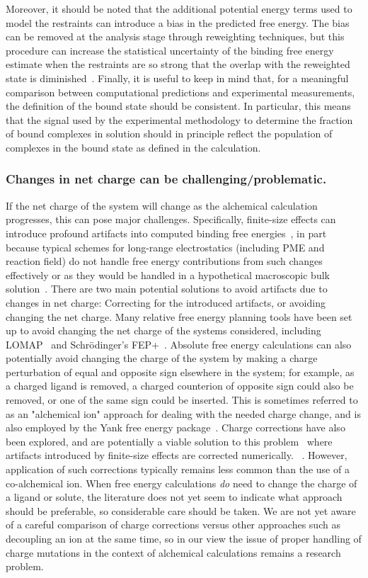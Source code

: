 \documentclass[9pt,bestpractices]{livecoms}
\begin{document}
Moreover, it should be noted that the additional potential energy terms used to model the restraints can introduce a bias in the predicted free energy.
The bias can be removed at the analysis stage through reweighting techniques, but this procedure can increase the statistical uncertainty of the binding free energy estimate when the restraints are so strong that the overlap with the reweighted state is diminished~\cite{}.
%
Finally, it is useful to keep in mind that, for a meaningful comparison between computational predictions and experimental measurements, the definition of the bound state should be consistent.
In particular, this means that the signal used by the experimental methodology to determine the fraction of bound complexes in solution should in principle reflect the population of complexes in the bound state as defined in the calculation.
%
\subsubsection{Changes in net charge can be challenging/problematic.}
If the net charge of the system will change as the alchemical calculation progresses, this can pose major challenges.
Specifically, finite-size effects can introduce profound artifacts into computed binding free energies~\cite{}, in part because typical schemes for long-range electrostatics (including PME and reaction field) do not handle free energy contributions from such changes effectively or as they would be handled in a hypothetical macroscopic bulk solution~\cite{}.
%
There are two main potential solutions to avoid artifacts due to changes in net charge: Correcting for the introduced artifacts, or avoiding changing the net charge.
%
Many relative free energy planning tools have been set up to avoid changing the net charge of the systems considered, including LOMAP~\cite{liu2013lead} and Schr\"{o}dinger's FEP+~\cite{wang2015accurate}. Absolute free energy calculations can also potentially avoid changing the charge of the system by making a charge perturbation of equal and opposite sign elsewhere in the system; for example, as a charged ligand is removed, a charged counterion of opposite sign could also be removed, or one of the same sign could be inserted. This is sometimes referred to as an "alchemical ion" approach for dealing with the needed charge change, and is also employed by the Yank free energy package~\cite{wang2013identifying}.
Charge corrections have also been explored, and are potentially a viable solution to this problem~\cite{mey2018impact} where artifacts introduced by finite-size effects are corrected numerically.
~\cite{chen2018accurate}. However, application of such corrections typically remains less common than the use of a co-alchemical ion.
%
When free energy calculations \emph{do} need to change the charge of a ligand or solute, the literature does not yet seem to indicate what approach should be preferable, so considerable care should be taken.
We are not yet aware of a careful comparison of charge corrections versus other approaches such as decoupling an ion at the same time, so in our view the issue of proper handling of charge mutations in the context of alchemical calculations remains a research problem.
%
\end{document}
